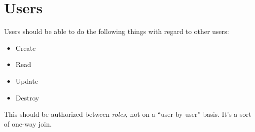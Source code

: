 \documentclass{article}
\begin{document}
\section{Users}

Users should be able to do the following things with regard to other users:

\begin{itemize}
  \item Create
  \item Read
  \item Update
  \item Destroy
\end{itemize}

This should be authorized between \emph{roles}, not on a ``user by user'' basis.
It's a sort of one-way join.
\end{document}
